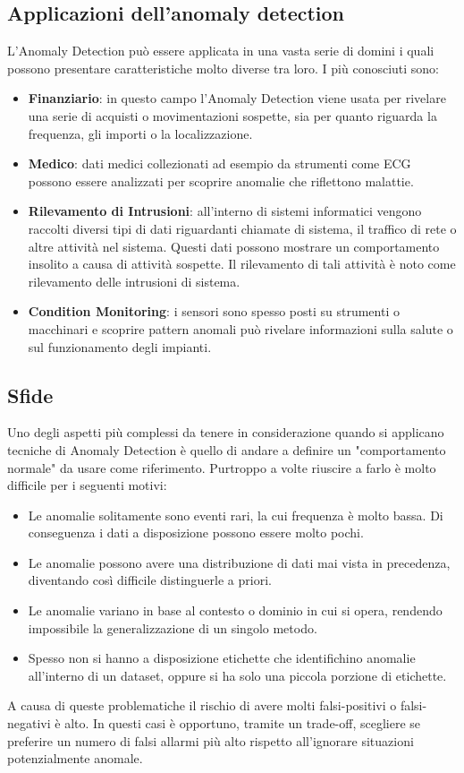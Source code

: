 \subsection{Applicazioni dell'anomaly detection}
L'Anomaly Detection può essere applicata in una vasta serie di domini i quali possono presentare caratteristiche molto diverse tra loro. I più conosciuti sono:
\begin{itemize}
	\item \textbf{Finanziario}: in questo campo l'Anomaly Detection viene usata per rivelare una serie di acquisti o movimentazioni sospette, sia per quanto riguarda la frequenza, gli importi o la localizzazione.
	\item \textbf{Medico}: dati medici collezionati ad esempio da strumenti come ECG possono essere analizzati per scoprire anomalie che riflettono malattie.
	\item \textbf{Rilevamento di Intrusioni}: all'interno di sistemi informatici vengono raccolti diversi tipi di dati riguardanti chiamate di sistema, il traffico di rete o altre attività nel sistema. Questi dati possono mostrare un comportamento insolito a causa di attività sospette. Il rilevamento di tali attività è noto come rilevamento delle intrusioni di sistema.
	\item \textbf{Condition Monitoring}: i sensori sono spesso posti su strumenti o macchinari e scoprire pattern anomali può rivelare informazioni sulla salute o sul funzionamento degli impianti.
\end{itemize}

\subsection{Sfide}
Uno degli aspetti più complessi da tenere in considerazione quando si applicano tecniche di Anomaly Detection è quello di andare a definire un "comportamento normale" da usare come riferimento. Purtroppo a volte riuscire a farlo è molto difficile per i seguenti motivi:
\begin{itemize}
	\item Le anomalie solitamente sono eventi rari, la cui frequenza è molto bassa. Di conseguenza i dati a disposizione possono essere molto pochi.
	\item Le anomalie possono avere una distribuzione di dati mai vista in precedenza, diventando così difficile distinguerle a priori.
	\item Le anomalie variano in base al contesto o dominio in cui si opera, rendendo impossibile la generalizzazione di un singolo metodo.
	\item Spesso non si hanno a disposizione etichette che identifichino anomalie all'interno di un dataset, oppure si ha solo una piccola porzione di etichette.
\end{itemize}
A causa di queste problematiche il rischio di avere molti falsi-positivi o falsi-negativi è alto. In questi casi è opportuno, tramite un trade-off, scegliere se preferire un numero di falsi allarmi più alto rispetto all'ignorare situazioni potenzialmente anomale.

